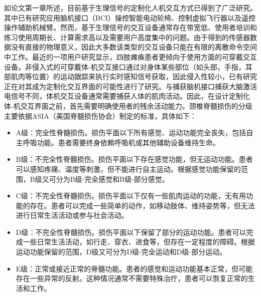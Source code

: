 如论文第一章所述，目前基于生理信号的定制化人机交互方式已得到了广泛研究。其中已有研究应用脑机接口（BCI）操控智能电动轮椅\cite{cruzSelfPacedBCICollaborative2021}、控制虚拟飞行器\cite{krygerFlightSimulationUsing2017}以及遥控操作辅助机械臂\cite{gilliniAssistiveSharedControl2021}。然而，基于生理信号的交互设备通常存在带宽低、使用者培训和练习使用周期长、计算需求高以及需要用户高度集中的问题。由于得到的传感器数据没有直接的物理意义，因此大多数该类型的交互设备只能在有限的离散命令空间中工作。最近的一项用户研究显示，四肢瘫痪患者更倾向于使用方面的可穿戴交互设备\cite{zhangUnderstandingInteractionsSmart2022}。非侵入式的可穿戴体-机交互接口通过对身体某些部位（如头部，手指，耳部肌肉等位置）的运动跟踪来执行实时感知信号获取，因此侵入性较小，已有研究正在对其成为定制化交互界面的可能性进行了研究\cite{miehlbradtDatadrivenBodyMachine2018a,zhouNonInvasiveHumanMachineInterface2022}。与捕获脑机接口捕获大脑激活电信号不同，体机交互设备通常需要捕获人体的肌肉活动。因此，在设计定制化体-机交互界面之前，首先需要明确使用者的残余活动能力。颈椎脊髓损伤的分级主要依据ASIA（美国脊髓损伤协会）制定的标准\cite{SpinalCordInjury}，具体如下：

\begin{itemize}
\item A级：完全性脊髓损伤。损伤平面以下所有感觉、运动功能完全丧失，包括自主呼吸功能。患者需要终身依赖呼吸机或其他辅助设备维持生命。
\item B级：不完全性脊髓损伤。损伤平面以下存在感觉功能，但无运动功能。患者可以感知疼痛、温度等刺激，但不能进行自主运动。根据感觉功能保留的范围，B级又可分为B级-完全感觉和B级-部分感觉。
\item C级：不完全性脊髓损伤。损伤平面以下仅有一些肌肉运动的功能，无有用功能的存在。患者可以完成一些简单的动作，如移动肢体、维持姿势等，但无法进行日常生活活动或参与社会活动。
\item D级：不完全性脊髓损伤。损伤平面以下保留了部分的运动功能。患者可以完成一些日常生活活动，如行走、穿衣、进食等，但存在一定程度的障碍。根据运动功能保留的范围，D级又可分为D级-完全运动和D级-部分运动。
\item E级：正常或接近正常的脊髓功能。患者的感觉和运动功能基本正常，但可能存在一些异常的反射。这种情况通常不需要特殊治疗，患者可以恢复正常的生活和工作。
\end{itemize}

